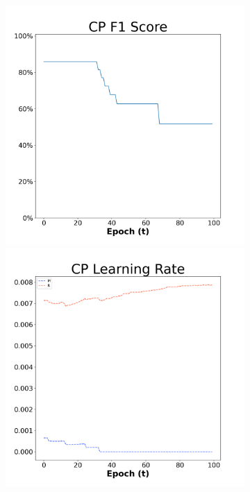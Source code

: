 \begin{figure}[H]
    \centering %
\begin{subfigure}{0.3\textwidth}
  \includegraphics[width=\linewidth]{images/exper2/Sonar/CP_0.01_f1.png}
    \includegraphics[width=\linewidth]{images/exper2/Sonar/CP_0.01_lr.png}

\end{subfigure}
\end{figure}
